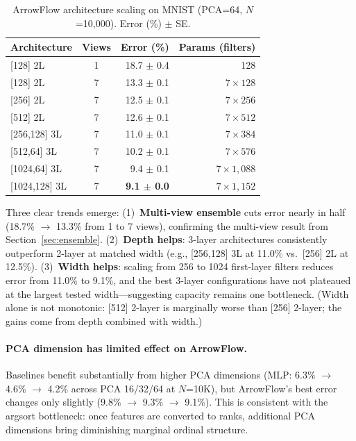 \documentclass[12pt]{article}
\begin{document}
\begin{table}[ht]
\centering
\caption{ArrowFlow architecture scaling on MNIST (PCA=64, $N$=10{,}000). Error (\%) $\pm$ SE.}
\label{tab:mnist-scaling}
\small
\begin{tabular}{lcrr}
\toprule
Architecture & Views & Error (\%) & Params (filters) \\
\midrule
{[128]} 2L     & 1 & 18.7 $\pm$ 0.4 & 128 \\
{[128]} 2L     & 7 & 13.3 $\pm$ 0.1 & $7 \times 128$ \\
{[256]} 2L     & 7 & 12.5 $\pm$ 0.1 & $7 \times 256$ \\
{[512]} 2L     & 7 & 12.6 $\pm$ 0.1 & $7 \times 512$ \\
{[256,128]} 3L & 7 & 11.0 $\pm$ 0.1 & $7 \times 384$ \\
{[512,64]} 3L  & 7 & 10.2 $\pm$ 0.1 & $7 \times 576$ \\
{[1024,64]} 3L & 7 & 9.4 $\pm$ 0.1  & $7 \times 1{,}088$ \\
{[1024,128]} 3L& 7 & \textbf{9.1 $\pm$ 0.0} & $7 \times 1{,}152$ \\
\bottomrule
\end{tabular}
\end{table}

Three clear trends emerge: (1)~\textbf{Multi-view ensemble} cuts error nearly in half (18.7\% $\to$ 13.3\% from 1 to 7 views), confirming the multi-view result from Section~\ref{sec:ensemble}. (2)~\textbf{Depth helps}: 3-layer architectures consistently outperform 2-layer at matched width (e.g., [256,128] 3L at 11.0\% vs.\ [256] 2L at 12.5\%). (3)~\textbf{Width helps}: scaling from 256 to 1024 first-layer filters reduces error from 11.0\% to 9.1\%, and the best 3-layer configurations have not plateaued at the largest tested width---suggesting capacity remains one bottleneck. (Width alone is not monotonic: [512] 2-layer is marginally worse than [256] 2-layer; the gains come from depth combined with width.)

\paragraph{PCA dimension has limited effect on ArrowFlow.} Baselines benefit substantially from higher PCA dimensions (MLP: 6.3\% $\to$ 4.6\% $\to$ 4.2\% across PCA 16/32/64 at $N$=10K), but ArrowFlow's best error changes only slightly (9.8\% $\to$ 9.3\% $\to$ 9.1\%). This is consistent with the argsort bottleneck: once features are converted to ranks, additional PCA dimensions bring diminishing marginal ordinal structure.
\end{document}
